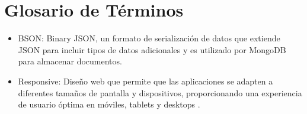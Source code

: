 \documentclass[12pt,a4paper]{report}
\begin{document}
\chapter*{Glosario de Términos}
\begin{itemize}
    \item BSON: Binary JSON, un formato de serialización de datos que extiende JSON para incluir tipos de datos adicionales y es utilizado por MongoDB para almacenar documentos.
    \item Responsive: Diseño web que permite que las aplicaciones se adapten a diferentes tamaños de pantalla y dispositivos, proporcionando una experiencia de usuario óptima en móviles, tablets y desktops .
\end{itemize}




\end{document}
